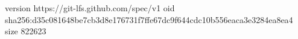 version https://git-lfs.github.com/spec/v1
oid sha256:d35c081648be7cb3d8e176731f7ffe67dc9f644cdc10b556eaca3e3284ea8ea4
size 822623
